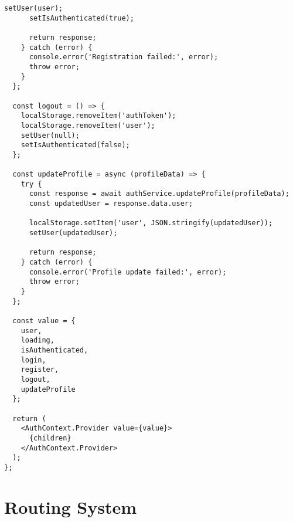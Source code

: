\documentclass[12pt,a4paper]{article}
\begin{document}
\begin{lstlisting}[caption=Authentication Context]
      setUser(user);
      setIsAuthenticated(true);

      return response;
    } catch (error) {
      console.error('Registration failed:', error);
      throw error;
    }
  };

  const logout = () => {
    localStorage.removeItem('authToken');
    localStorage.removeItem('user');
    setUser(null);
    setIsAuthenticated(false);
  };

  const updateProfile = async (profileData) => {
    try {
      const response = await authService.updateProfile(profileData);
      const updatedUser = response.data.user;

      localStorage.setItem('user', JSON.stringify(updatedUser));
      setUser(updatedUser);

      return response;
    } catch (error) {
      console.error('Profile update failed:', error);
      throw error;
    }
  };

  const value = {
    user,
    loading,
    isAuthenticated,
    login,
    register,
    logout,
    updateProfile
  };

  return (
    <AuthContext.Provider value={value}>
      {children}
    </AuthContext.Provider>
  );
};
\end{lstlisting}

\section{Routing System}
\end{document}
